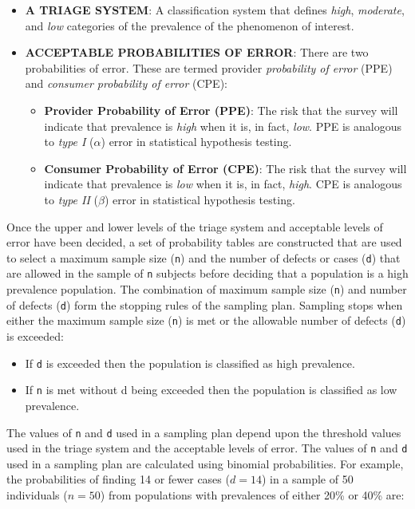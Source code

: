 \documentclass[
  12pt,
  a4paper]{book}
\begin{document}
\begin{itemize}
\item
  \textbf{A TRIAGE SYSTEM}: A classification system that defines \emph{high}, \emph{moderate}, and \emph{low} categories of the prevalence of the phenomenon of interest.
\item
  \textbf{ACCEPTABLE PROBABILITIES OF ERROR}: There are two probabilities of error. These are termed provider \emph{probability of error} (PPE) and \emph{consumer probability of error} (CPE):

  \begin{itemize}
  \item
    \textbf{Provider Probability of Error (PPE)}: The risk that the survey will indicate that prevalence is \emph{high} when it is, in fact, \emph{low}. PPE is analogous to \emph{type I} (\(\alpha\)) error in statistical hypothesis testing.
  \item
    \textbf{Consumer Probability of Error (CPE)}: The risk that the survey will indicate that prevalence is \emph{low} when it is, in fact, \emph{high}. CPE is analogous to \emph{type II} (\(\beta\)) error in statistical hypothesis testing.
  \end{itemize}
\end{itemize}

Once the upper and lower levels of the triage system and acceptable levels of error have been decided, a set of probability tables are constructed that are used to select a maximum sample size (\texttt{n}) and the number of defects or cases (\texttt{d}) that are allowed in the sample of \texttt{n} subjects before deciding that a population is a high prevalence population. The combination of maximum sample size (\texttt{n}) and number of defects (\texttt{d}) form the stopping rules of the sampling plan. Sampling stops when either the maximum sample size (\texttt{n}) is met or the allowable number of defects (\texttt{d}) is exceeded:

\begin{itemize}
\item
  If \texttt{d} is exceeded then the population is classified as high prevalence.
\item
  If \texttt{n} is met without d being exceeded then the population is classified as low prevalence.
\end{itemize}

The values of \texttt{n} and \texttt{d} used in a sampling plan depend upon the threshold values used in the triage system and the acceptable levels of error. The values of \texttt{n} and \texttt{d} used in a sampling plan are calculated using binomial probabilities. For example, the probabilities of finding 14 or fewer cases (\(d = 14\)) in a sample of 50 individuals (\(n = 50\)) from populations with prevalences of either 20\% or 40\% are:
\end{document}
